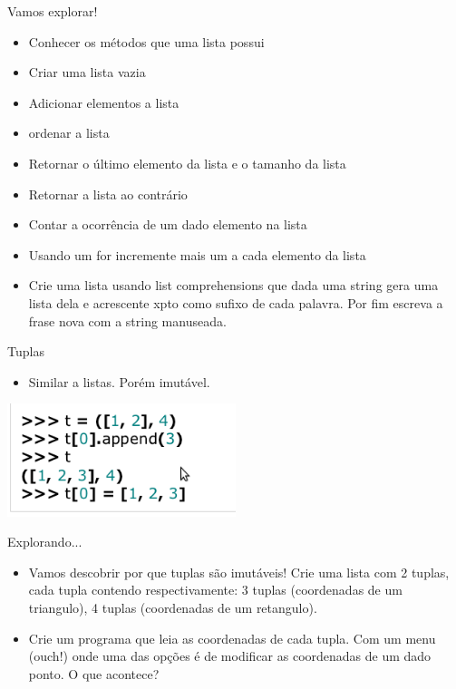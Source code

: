 \documentclass{beamer}
\begin{document}
\begin{frame}{Vamos explorar!}
 \begin{itemize}
  \item Conhecer os m\'etodos que uma lista possui
  \item Criar uma lista vazia
  \item Adicionar elementos a lista
  \item ordenar a lista
  \item Retornar o \'ultimo elemento da lista e o tamanho da lista
  \item Retornar a lista ao contr\'ario
  \item Contar a ocorr\^encia de um dado elemento na lista
  \item Usando um for incremente mais um a cada elemento da lista
  \item Crie uma lista usando list comprehensions que dada uma string gera uma lista dela e acrescente xpto como sufixo de cada palavra. Por fim
escreva a frase nova com a string manuseada.
 \end{itemize}

\end{frame}

\begin{frame}{Tuplas}
 \begin{itemize}
  \item Similar a listas. Por\'em imut\'avel.
  
 \end{itemize}

  \begin{center}
   \includegraphics[width=0.5\textwidth]{images/tuplas.png}
\end{center}
\end{frame}

\begin{frame}{Explorando...}
 \begin{itemize}
  \item Vamos descobrir por que tuplas s\~ao imut\'aveis! Crie uma lista com 2 tuplas, cada tupla contendo respectivamente: 3 tuplas (coordenadas de um triangulo), 4 tuplas (coordenadas de um retangulo).
  \item Crie um programa que leia as coordenadas de cada tupla. Com um menu (ouch!) onde uma das op\c{c}\~oes \'e de modificar as coordenadas de um dado ponto. O que acontece?
 \end{itemize}

\end{frame}
\end{document}
